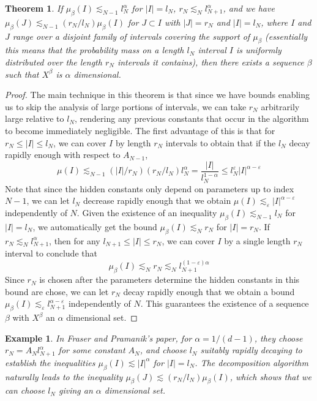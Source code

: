 \documentclass{report}
\theoremstyle{plain}
\newtheorem*{example}{Example}
\theoremstyle{plain}
\newtheorem{theorem}{Theorem}
\begin{document}
\begin{theorem}
    If $\mu_\beta(I) \lesssim_{N-1} l_N^\alpha$ for $|I| = l_N$, $r_N \lesssim_N l_{N+1}^\alpha$, and we have $\mu_\beta(J) \lesssim_{N-1} (r_N/l_N) \mu_\beta(I)$ for $J \subset I$ with $|J| = r_N$ and $|I| = l_N$, where $I$ and $J$ range over a disjoint family of intervals covering the support of $\mu_\beta$ (essentially this means that the probability mass on a length $l_N$ interval $I$ is uniformly distributed over the length $r_N$ intervals it contains), then there exists a sequence $\beta$ such that $X^\beta$ is $\alpha$ dimensional.
\end{theorem}
\begin{proof}
    The main technique in this theorem is that since we have bounds enabling us to skip the analysis of large portions of intervals, we can take $r_N$ arbitrarily large relative to $l_N$, rendering any previous constants that occur in the algorithm to become immediately negligible. The first advantage of this is that for $r_N \leq |I| \leq l_N$, we can cover $I$ by length $r_N$ intervals to obtain that if the $l_N$ decay rapidly enough with respect to $A_{N-1}$,
%
\[ \mu(I) \lesssim_{N-1} (|I|/r_N) (r_N/l_N) l_N^\alpha = \frac{|I|}{l_N^{1 - \alpha}} \leq l_N^\varepsilon |I|^{\alpha - \varepsilon} \]
%
Note that since the hidden constants only depend on parameters up to index $N-1$, we can let $l_N$ decrease rapidly enough that we obtain $\mu(I) \lesssim_\varepsilon |I|^{\alpha - \varepsilon}$ independently of $N$. Given the existence of an inequality $\mu_\beta(I) \lesssim_{N-1} l_N$ for $|I| = l_N$, we automatically get the bound $\mu_\beta(I) \lesssim_N r_N$ for $|I| = r_N$. If $r_N \lesssim_N l_{N+1}^\alpha$, then for any $l_{N+1} \leq |I| \leq r_N$, we can cover $I$ by a single length $r_N$ interval to conclude that
%
\[ \mu_\beta(I) \lesssim_N r_N \lesssim_N l_{N+1}^{(1 - \varepsilon) \alpha} \]
%
Since $r_N$ is chosen after the parameters determine the hidden constants in this bound are chose, we can let $r_N$ decay rapidly enough that we obtain a bound $\mu_\beta(I) \lesssim_\varepsilon l_{N+1}^{\alpha - \varepsilon}$ independently of $N$. This guarantees the existence of a sequence $\beta$ with $X^\beta$ an $\alpha$ dimensional set.
\end{proof}

\begin{example}
    In Fraser and Pramanik's paper, for $\alpha = 1/(d-1)$, they choose $r_N = A_N l_{N+1}^\alpha$ for some constant $A_N$, and choose $l_N$ suitably rapidly decaying to establish the inequalities $\mu_\beta(I) \lesssim |I|^\alpha$ for $|I| = l_N$. The decomposition algorithm naturally leads to the inequality $\mu_\beta(J) \lesssim (r_N/l_N) \mu_\beta(I)$, which shows that we can choose $l_N$ giving an $\alpha$ dimensional set.
\end{example}
\end{document}
